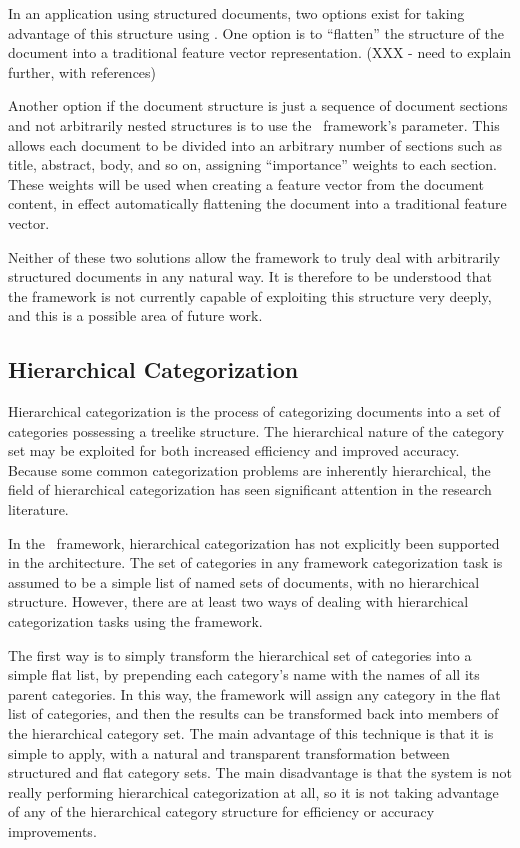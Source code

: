 In an application using structured documents, two options exist for
taking advantage of this structure using \aicat.  One option is to
``flatten'' the structure of the document into a traditional feature
vector representation. (XXX - need to explain further, with
references)  

Another option if the document structure is just a sequence of
document sections and not arbitrarily nested structures is to use the
\aicat\ framework's  parameter.  This allows
each document to be divided into an arbitrary number of sections such
as title, abstract, body, and so on, assigning ``importance'' weights
to each section.  These weights will be used when creating a feature
vector from the document content, in effect automatically flattening
the document into a traditional feature vector.

Neither of these two solutions allow the framework to truly deal with
arbitrarily structured documents in any natural way.  It is therefore
to be understood that the framework is not currently capable of
exploiting this structure very deeply, and this is a possible area of
future work.

\subsection{Hierarchical Categorization}
\label{hierarchical}

Hierarchical categorization is the process of categorizing documents
into a set of categories possessing a treelike structure.  The
hierarchical nature of the category set may be exploited for both
increased efficiency and improved accuracy. \cite{dumais:00}  Because
some common categorization problems are inherently hierarchical, the
field of hierarchical categorization has seen significant attention in
the research literature. \cite[p. 7]{sebastiani:02}

In the \aicat\ framework, hierarchical categorization has not
explicitly been supported in the architecture.  The set of categories
in any framework categorization task is assumed to be a simple list of
named sets of documents, with no hierarchical structure.  However,
there are at least two ways of dealing with hierarchical
categorization tasks using the framework.

The first way is to simply transform the hierarchical set of
categories into a simple flat list, by prepending each category's name
with the names of all its parent categories.  In this way, the
framework will assign any category in the flat list of categories, and
then the results can be transformed back into members of the
hierarchical category set.  The main advantage of this technique is
that it is simple to apply, with a natural and transparent
transformation between structured and flat category sets.  The main
disadvantage is that the system is not really performing hierarchical
categorization at all, so it is not taking advantage of any of the
hierarchical category structure for efficiency or accuracy
improvements.

